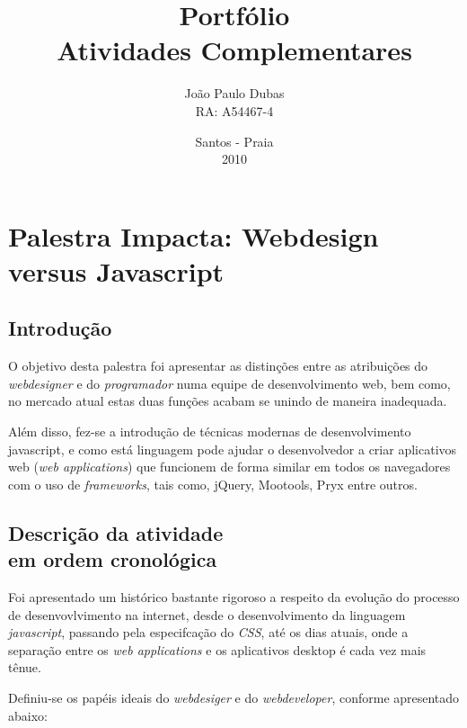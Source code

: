 \documentclass[a4paper]{report}
\begin{document}
    \title{Portfólio\\Atividades Complementares}
    \author{João Paulo Dubas\\RA: A54467-4}
    \date{Santos - Praia\\2010}

    \maketitle

    \tableofcontents

    \chapter[Webdesign versus Javascript]{Palestra Impacta: Webdesign versus
    Javascript}

        \section{Introdução}
        O objetivo desta palestra foi apresentar as distinções entre as
        atribuições do \emph{webdesigner} e do \emph{programador} numa
        equipe de desenvolvimento web, bem como, no mercado atual estas
        duas funções acabam se unindo de maneira inadequada.

        Além disso, fez-se a introdução de técnicas modernas de
        desenvolvimento javascript, e como está linguagem pode ajudar
        o desenvolvedor a criar aplicativos web (\emph{web applications})
        que funcionem de forma similar em todos os navegadores com o
        uso de \emph{frameworks}, tais como, jQuery, Mootools, Pryx
        entre outros.

        \section[Descrição atividade]{Descrição da atividade
        \\em ordem cronológica}
        Foi apresentado um histórico bastante rigoroso a respeito da
        evolução do processo de desenvovlvimento na internet, desde o
        desenvolvimento da linguagem \emph{javascript}, passando pela
        especifcação do \emph{CSS}, até os dias atuais, onde a
        separação entre os \emph{web applications} e os aplicativos
        desktop é cada vez mais tênue.

        Definiu-se os papéis ideais do \emph{webdesiger} e do
        \emph{webdeveloper}, conforme apresentado abaixo:
\end{document}
